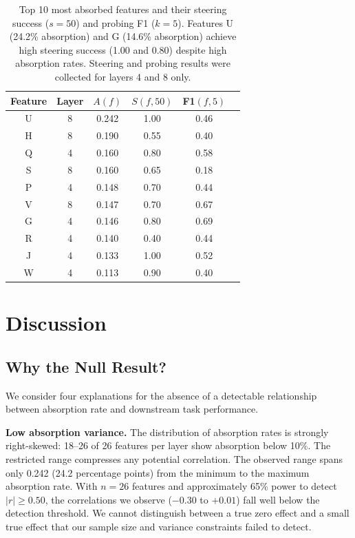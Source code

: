 \documentclass{article}
\begin{document}
\begin{table}[t]
\caption{Top 10 most absorbed features and their steering success ($s = 50$) and probing F1 ($k = 5$). Features U (24.2\% absorption) and G (14.6\% absorption) achieve high steering success (1.00 and 0.80) despite high absorption rates. Steering and probing results were collected for layers 4 and 8 only.}
\label{tab:top_absorbed}
\centering
\begin{tabular}{cccccc}
\toprule
Feature & Layer & $A(f)$ & $S(f, 50)$ & F1$(f, 5)$ \\
\midrule
U       & 8     & 0.242  & 1.00       & 0.46        \\
H       & 8     & 0.190  & 0.55       & 0.40        \\
Q       & 4     & 0.160  & 0.80       & 0.58        \\
S       & 8     & 0.160  & 0.65       & 0.18        \\
P       & 4     & 0.148  & 0.70       & 0.44        \\
V       & 8     & 0.147  & 0.70       & 0.67        \\
G       & 4     & 0.146  & 0.80       & 0.69        \\
R       & 4     & 0.140  & 0.40       & 0.44        \\
J       & 4     & 0.133  & 1.00       & 0.52        \\
W       & 4     & 0.113  & 0.90       & 0.40        \\
\bottomrule
\end{tabular}
\end{table}

\section{Discussion}
\label{sec:discussion}

\subsection{Why the Null Result?}

We consider four explanations for the absence of a detectable relationship between absorption rate and downstream task performance.

\textbf{Low absorption variance.} The distribution of absorption rates is strongly right-skewed: 18--26 of 26 features per layer show absorption below 10\%. The restricted range compresses any potential correlation. The observed range spans only 0.242 (24.2 percentage points) from the minimum to the maximum absorption rate. With $n = 26$ features and approximately 65\% power to detect $|r| \geq 0.50$, the correlations we observe ($-0.30$ to $+0.01$) fall well below the detection threshold. We cannot distinguish between a true zero effect and a small true effect that our sample size and variance constraints failed to detect.
\end{document}
